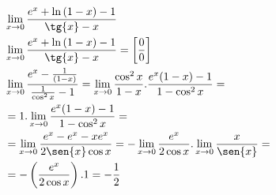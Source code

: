 \begin{ex}
\begin{align}
&\lim_{x\rightarrow 0} \frac{e^{x}+\ln{(1-x)}-1}{\tg{x}-x}\nonumber\\
&\lim_{x\rightarrow 0} \frac{e^{x}+\ln{(1-x)}-1}{\tg{x}-x}=\left[\frac{0}{0}\right]\nonumber\\
&\lim_{x\rightarrow 0} \frac{e^{x}-\frac{1}{(1-x)}}{\frac{1}{\cos^2{x}}-1}=\lim_{x\rightarrow 0} \frac{\cos^2{x}}{1-x}.\frac{e^{x}(1-x)-1}{1-\cos^2{x}}=\nonumber\\
&=1.\lim_{x\rightarrow 0} \frac{e^{x}(1-x)-1}{1-\cos^2{x}}=\nonumber\\
&=\lim_{x\rightarrow 0} \frac{e^{x}-e^{x}-xe^{x}}{2\sen{x}\cos{x}}=-\lim_{x\rightarrow 0} \frac{e^{x}}{2\cos{x}}.\lim_{x\rightarrow 0} \frac{x}{\sen{x}}=\nonumber\\
&=-\left(\frac{e^{x}}{2\cos{x}}\right).1=-\frac{1}{2}\nonumber
\end{align}
\end{ex}
